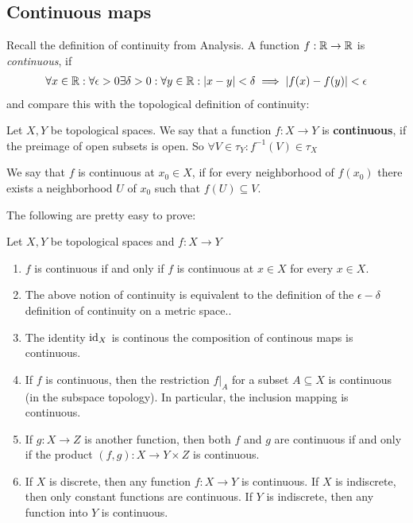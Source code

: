 \subsection{Continuous maps}
Recall the definition of continuity from Analysis. A function $f: \mathbb{R} \to \mathbb{R}$ is \emph{continuous}, if
\begin{align*}
  \forall x \in \mathbb{R}: \forall \epsilon > 0 \exists \delta > 0: \forall y \in \mathbb{R}: \vert x - y\vert < \delta \implies \vert f(x) - f(y)\vert < \epsilon
\end{align*}
and compare this with the topological definition of continuity:
\begin{dfn}[]
Let $X,Y$ be topological spaces. 
We say that a function $f: X \to Y$ is \textbf{continuous}, if the preimage of open subsets is open. So $\forall V \in \tau_Y: f^{-1}(V) \in \tau_X$

We say that $f$ is continuous at $x_0 \in X$, if for every neighborhood of $f(x_0)$ there exists a neighborhood $U$ of $x_0$ such that $f(U) \subseteq V$.
\end{dfn}

The following are pretty easy to prove:
\begin{rem}[]
  Let $X,Y$ be topological spaces and $f: X \to Y$
  \begin{enumerate}
    \item $f$ is continuous if and only if $f$ is continuous at $x \in X$ for every $x \in X$.
    \item The above notion of continuity is equivalent to the definition of the $\epsilon-\delta$ definition of continuity on a metric space..
    \item The identity $\operatorname{id}_X$ is continous the composition of continous maps is continuous.
    \item If $f$ is continuous, then the restriction $f|_A$ for a subset $A \subseteq X$ is continuous (in the subspace topology). In particular, the inclusion mapping is continuous.
    \item If $g: X \to Z$ is another function, then both $f$ and $g$ are continuous if and only if the product $(f,g): X \to Y \times Z$ is continuous.
    \item If $X$ is discrete, then any function $f: X \to  Y$ is continuous. 
      If $X$ is indiscrete, then only constant functions are continuous. If $Y$ is indiscrete, then any function into $Y$ is continuous.
  \end{enumerate}
\end{rem}

